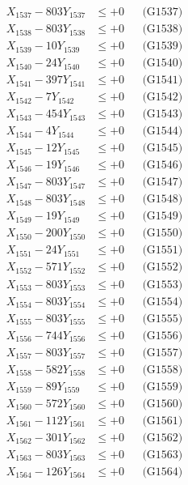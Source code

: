 \documentclass[a4paper,10pt]{article}
\begin{document}
{\begin{align}
X_{1537} - 803Y_{1537} &\leq +0 && \text{(G1537)} \\
X_{1538} - 803Y_{1538} &\leq +0 && \text{(G1538)} \\
X_{1539} - 10Y_{1539} &\leq +0 && \text{(G1539)} \\
X_{1540} - 24Y_{1540} &\leq +0 && \text{(G1540)} \\
\allowbreak
X_{1541} - 397Y_{1541} &\leq +0 && \text{(G1541)} \\
X_{1542} - 7Y_{1542} &\leq +0 && \text{(G1542)} \\
X_{1543} - 454Y_{1543} &\leq +0 && \text{(G1543)} \\
X_{1544} - 4Y_{1544} &\leq +0 && \text{(G1544)} \\
X_{1545} - 12Y_{1545} &\leq +0 && \text{(G1545)} \\
X_{1546} - 19Y_{1546} &\leq +0 && \text{(G1546)} \\
X_{1547} - 803Y_{1547} &\leq +0 && \text{(G1547)} \\
X_{1548} - 803Y_{1548} &\leq +0 && \text{(G1548)} \\
X_{1549} - 19Y_{1549} &\leq +0 && \text{(G1549)} \\
X_{1550} - 200Y_{1550} &\leq +0 && \text{(G1550)} \\
\allowbreak
X_{1551} - 24Y_{1551} &\leq +0 && \text{(G1551)} \\
X_{1552} - 571Y_{1552} &\leq +0 && \text{(G1552)} \\
X_{1553} - 803Y_{1553} &\leq +0 && \text{(G1553)} \\
X_{1554} - 803Y_{1554} &\leq +0 && \text{(G1554)} \\
X_{1555} - 803Y_{1555} &\leq +0 && \text{(G1555)} \\
X_{1556} - 744Y_{1556} &\leq +0 && \text{(G1556)} \\
X_{1557} - 803Y_{1557} &\leq +0 && \text{(G1557)} \\
X_{1558} - 582Y_{1558} &\leq +0 && \text{(G1558)} \\
X_{1559} - 89Y_{1559} &\leq +0 && \text{(G1559)} \\
X_{1560} - 572Y_{1560} &\leq +0 && \text{(G1560)} \\
\allowbreak
X_{1561} - 112Y_{1561} &\leq +0 && \text{(G1561)} \\
X_{1562} - 301Y_{1562} &\leq +0 && \text{(G1562)} \\
X_{1563} - 803Y_{1563} &\leq +0 && \text{(G1563)} \\
X_{1564} - 126Y_{1564} &\leq +0 && \text{(G1564)} \\

\end{align}}
\end{document}
